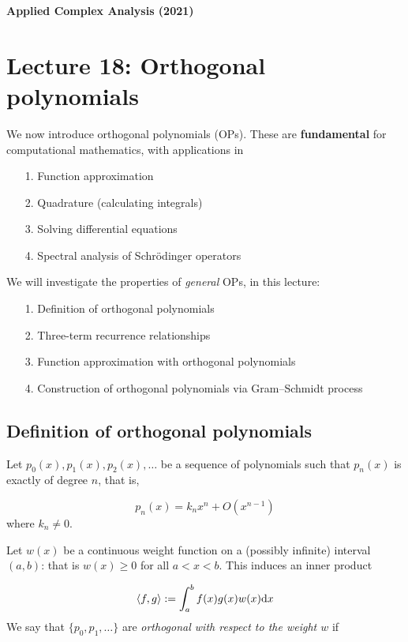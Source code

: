 \documentclass[12pt,a4paper]{article}
\def\D{ {\rm d} }
\def\ip<#1>{\left\langle{#1}\right\rangle}
\def\dx{\D x}
\def\endash{–}
\begin{document}
\textbf{Applied Complex Analysis (2021)}

\section{Lecture 18: Orthogonal polynomials}
We now introduce orthogonal polynomials (OPs). These are \textbf{fundamental} for computational mathematics, with applications in

\begin{itemize}
\item[1. ] Function approximation


\item[2. ] Quadrature (calculating integrals)


\item[3. ] Solving differential equations


\item[4. ] Spectral analysis of Schrödinger operators

\end{itemize}
We will investigate the properties of \emph{general} OPs, in this lecture:

\begin{itemize}
\item[1. ] Definition of orthogonal polynomials


\item[2. ] Three-term recurrence relationships


\item[3. ] Function approximation with orthogonal polynomials


\item[4. ] Construction of orthogonal polynomials via Gram\ensuremath{\endash}Schmidt process

\end{itemize}
\subsection{Definition of orthogonal polynomials}
Let $p_0(x),p_1(x),p_2(x),\ensuremath{\ldots}$ be a sequence of polynomials such that $p_n(x)$ is exactly of degree $n$, that is,

\[
p_n(x) = k_n x^n + O(x^{n-1})
\]
where $k_n \neq 0$.

Let $w(x)$ be a continuous weight function on a (possibly infinite) interval $(a,b)$: that is $w(x) \geq 0$ for all $a < x < b$. This induces an inner product

\[
\ip<f,g> := \int_a^b f(x) g(x) w(x) \dx
\]
We say that $\{p_0, p_1,\ldots\}$ are \emph{orthogonal with respect to the weight $w$} if
\end{document}
